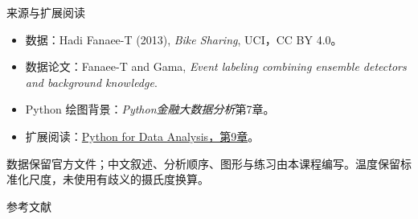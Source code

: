 \documentclass[9pt]{ctexbeamer}
\begin{document}
\begin{frame}{来源与扩展阅读}
\begin{itemize}
\item 数据：Hadi Fanaee-T (2013), \textit{Bike Sharing}, UCI，CC BY 4.0。\citep{fanaee2013bike}
\item 数据论文：Fanaee-T and Gama, \textit{Event labeling combining ensemble detectors and background knowledge}.\citep{fanaee2013event}
\item Python 绘图背景：\textit{Python金融大数据分析}第7章。\citep{hilpisch2018python}
\item 扩展阅读：\href{https://wesmckinney.com/book/plotting-and-visualization}{Python for Data Analysis，第9章}。
\end{itemize}
\small 数据保留官方文件；中文叙述、分析顺序、图形与练习由本课程编写。温度保留标准化尺度，未使用有歧义的摄氏度换算。
\end{frame}

\appendix
\begin{frame}[allowframebreaks]{参考文献}


\end{frame}
\begin{frame}
\par\vspace{1cm}{\Huge Q \& A}
\end{frame}
\end{document}
